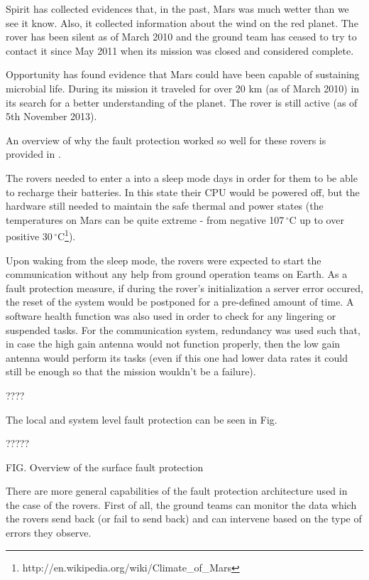 Spirit has collected evidences that, in the past, Mars was much wetter than we
see it know. Also, it collected information about the wind on the red planet.
The rover has been silent as of March 2010 and the ground team has ceased to try
to contact it since May 2011 when its mission was closed and considered
complete.

Opportunity has found evidence that Mars could have been capable of sustaining
microbial life. During its mission it traveled for over 20 km (as of March 2010)
in its search for a better understanding of the planet. The rover is still
active (as of 5th November 2013).

An overview of why the fault protection worked so well for these rovers is
provided in \cite{surv-nasa-mars}.

The rovers needed to enter a into a sleep mode days in order for them to be able
to recharge their batteries. In this state their CPU would be powered off, but
the hardware still needed to maintain the safe thermal and power states (the
temperatures on Mars can be quite extreme - from negative
107$\,^{\circ}\mathrm{C}$ up to over positive
30$\,^{\circ}\mathrm{C}$\footnote{http://en.wikipedia.org/wiki/Climate\_of\_Mars}).

Upon waking from the sleep mode, the rovers were expected to start the
communication without any help from ground operation teams on Earth. As a fault
protection measure, if during the rover's initialization a server error occured,
the reset of the system would be postponed for a pre-defined amount of time. A
software health function was also used in order to check for any lingering or
suspended tasks. For the communication system, redundancy was used such that, in
case the high gain antenna would not function properly, then the low gain
antenna would perform its tasks (even if this one had lower data rates it could
still be enough so that the mission wouldn't be a failure).


????

The local and system level fault protection can be seen in Fig. \cite{fprot}


?????


\missingfigure{}
FIG. Overview of the surface fault protection

There are more general capabilities of the fault protection architecture used in
the case of the rovers. First of all, the ground teams can monitor the data
which the rovers send back (or fail to send back) and can intervene based on the
type of errors they observe.

